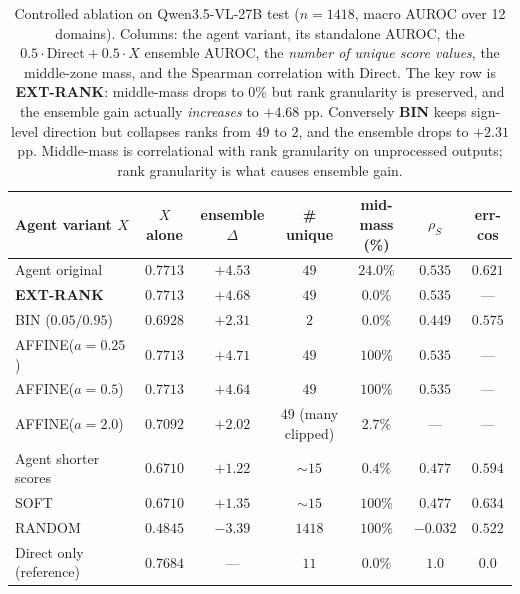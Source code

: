 \begin{table}[h]
\centering
\caption{Controlled ablation on Qwen3.5-VL-27B test ($n{=}1418$, macro AUROC over 12 domains). Columns: the agent variant, its standalone AUROC, the $0.5\!\cdot\!\mathrm{Direct}+0.5\!\cdot\!X$ ensemble AUROC, the \emph{number of unique score values}, the middle-zone mass, and the Spearman correlation with Direct. The key row is \textbf{EXT-RANK}: middle-mass drops to $0\%$ but rank granularity is preserved, and the ensemble gain actually \emph{increases} to $+4.68$ pp. Conversely \textbf{BIN} keeps sign-level direction but collapses ranks from $49$ to $2$, and the ensemble drops to $+2.31$ pp. Middle-mass is correlational with rank granularity on unprocessed outputs; rank granularity is what causes ensemble gain.}
\label{tab:score_diversity}
\small
\begin{tabular}{lcccccc}
\toprule
Agent variant $X$ & $X$ alone & ensemble $\Delta$ & \# unique & mid-mass (\%) & $\rho_S$ & err-cos \\
\midrule
Agent original         & $0.7713$ & $+4.53$ & $49$ & $24.0\%$ & $0.535$ & $0.621$ \\
\textbf{EXT-RANK}  & $0.7713$ & $\mathbf{+4.68}$ & $49$ & $0.0\%$  & $0.535$ & --- \\
BIN ($0.05/0.95$)  & $0.6928$ & $+2.31$ & $2$  & $0.0\%$  & $0.449$ & $0.575$ \\
AFFINE($a{=}0.25$) & $0.7713$ & $+4.71$ & $49$ & $100\%$  & $0.535$ & --- \\
AFFINE($a{=}0.5$)  & $0.7713$ & $+4.64$ & $49$ & $100\%$  & $0.535$ & --- \\
AFFINE($a{=}2.0$)  & $0.7092$ & $+2.02$ & $49$ (many clipped) & $2.7\%$ & --- & --- \\
Agent shorter scores           & $0.6710$ & $+1.22$ & $\sim\!15$ & $0.4\%$ & $0.477$ & $0.594$ \\
SOFT               & $0.6710$ & $+1.35$ & $\sim\!15$ & $100\%$ & $0.477$ & $0.634$ \\
RANDOM                & $0.4845$ & $-3.39$ & $1418$ & $100\%$ & $-0.032$ & $0.522$ \\
\midrule
Direct only (reference) & $0.7684$ & --- & $11$ & $0.0\%$ & $1.0$ & $0.0$ \\
\bottomrule
\end{tabular}
\end{table}

